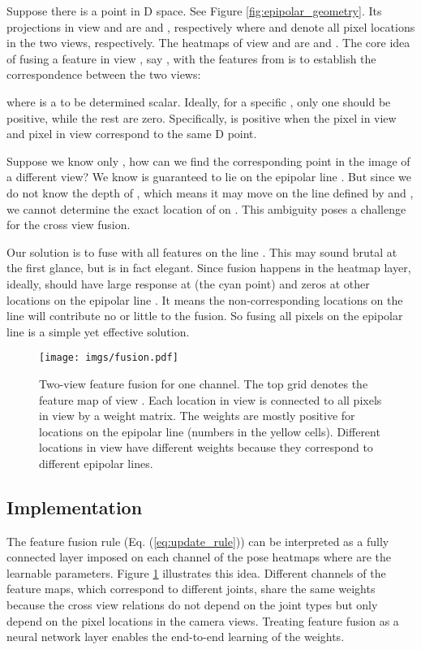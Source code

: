 \documentclass[10pt,twocolumn,letterpaper]{article}
\begin{document}
Suppose there is a point  in D space. See Figure \ref{fig:epipolar_geometry}. Its projections in view  and  are  and , respectively where  and  denote all pixel locations in the two views, respectively. The heatmaps of view  and  are  and . The core idea of fusing a feature in view , say , with the features from  is to establish the correspondence between the two views:

where  is a to be determined scalar. Ideally, for a specific , only one  should be positive, while the rest are zero. Specifically,  is positive when the pixel  in view  and pixel  in view  correspond to the same D point.

Suppose we know only , how can we find the corresponding point  in the image of a different view? We know  is guaranteed to lie on the epipolar line . But since we do not know the depth of , which means it may move on the line defined by  and , we cannot determine the exact location of  on . This ambiguity poses a challenge for the cross view fusion.

Our solution is to fuse  with all features on the line . This may sound brutal at the first glance, but is in fact elegant. Since fusion happens in the heatmap layer, ideally,  should have large response at  (the cyan point) and zeros at other locations on the epipolar line . It means the non-corresponding locations on the line will contribute no or little to the fusion. So fusing all pixels on the epipolar line is a simple yet effective solution. 


\begin{figure}
	\centering
	\texttt{[image: imgs/fusion.pdf]}
	\caption{Two-view feature fusion for one channel. The top grid denotes the feature map of view . Each location in view  is connected to all pixels in view  by a weight matrix. The weights are mostly positive for locations on the epipolar line (numbers in the yellow cells). Different locations in view  have different weights because they correspond to different epipolar lines.}
	\label{fig:feature_fusion}
\end{figure}


\subsection{Implementation}
The feature fusion rule (Eq. (\ref{eq:update_rule})) can be interpreted as a fully connected layer imposed on each channel of the pose heatmaps where  are the learnable parameters. Figure \ref{fig:feature_fusion} illustrates this idea. 
Different channels of the feature maps, which correspond to different joints, share the same weights because the cross view relations do not depend on the joint types but only depend on the pixel locations in the camera views. Treating feature fusion as a neural network layer enables the end-to-end learning of the weights. 
\end{document}
